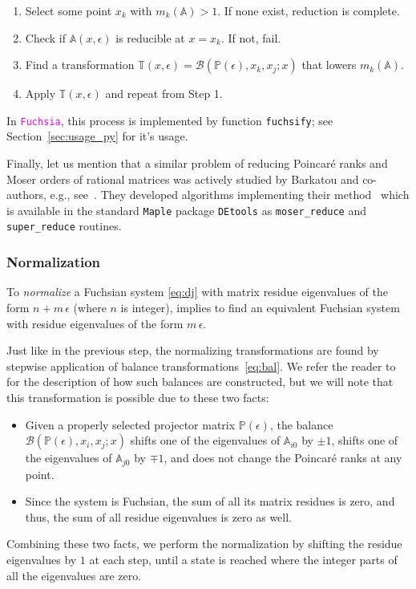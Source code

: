 \documentclass{elsarticle}
\newcommand{\eps}{\epsilon}
\newcommand{\fuchsia}{\textcolor{fuchsia}{\texttt{Fuchsia}}\xspace}
\newcommand{\code}[1]{\texttt{#1}}
\newcommand{\M}[1]{\mathbb{#1}} %
\begin{document}
\begin{enumerate}
    \item Select some point $x_k$ with $m_k(\M A) > 1$. If none exist, reduction is complete.
    \item Check if $\M A(x,\eps)$ is reducible at $x=x_k$. If not, fail.
    \item Find a transformation $\M T(x,\eps) = \mathcal{B}(\M P(\eps), x_k, x_j; x)$ that lowers $m_k(\M A)$.
    \item Apply $\M T(x,\eps)$ and repeat from Step 1.
\end{enumerate}

In \fuchsia, this process is implemented by function \code{fuchsify}; see Section~\ref{sec:usage_py} for it's usage.

Finally, let us mention that a similar problem of reducing Poincar\'e ranks and Moser orders of rational matrices was actively studied by Barkatou and co-authors, e.g., see~\cite{BP99}.
They developed algorithms implementing their method~\cite{BP99} which is available in the standard \texttt{Maple} package \texttt{DEtools} as \code{moser\_reduce} and \code{super\_reduce} routines.


\subsubsection{Normalization}
\label{sec:norm}

To \textit{normalize} a Fuchsian system \eqref{eq:dj} with matrix residue eigenvalues of the form $n+m\,\eps$ (where $n$ is integer), implies to find an equivalent Fuchsian system with residue eigenvalues of the form $m\,\eps$.

Just like in the previous step, the normalizing transformations are found by stepwise application of balance transformations~\eqref{eq:bal}.
We refer the reader to~\cite[p.~11]{Lee15} for the description of how such balances are constructed, but we will note that this transformation is possible due to these two facts:
\begin{itemize}
    \item Given a properly selected projector matrix $\M P(\eps)$, the balance $\mathcal{B}(\M P(\eps), x_i, x_j; x)$ shifts one of the eigenvalues of $\M A_{i0}$ by $\pm1$, shifts one of the eigenvalues of $\M A_{j0}$ by $\mp1$, and does not change the Poincar\'e ranks at any point.
    \item Since the system is Fuchsian, the sum of all its matrix residues is zero, and thus, the sum of all residue eigenvalues is zero as well.
\end{itemize}
Combining these two facts, we perform the normalization by shifting the residue eigenvalues by $1$ at each step, until a state is reached where the integer parts of all the eigenvalues are zero.
\end{document}
